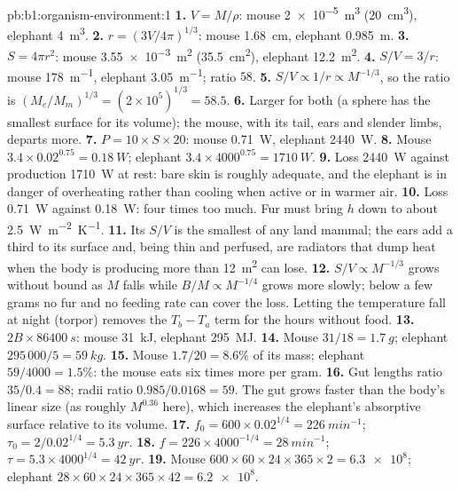 \begin{solution}{pb:b1:organism-environment:1}
\textbf{1.} $V = M/\rho$: mouse \qty{2e-5}{m^3} (\qty{20}{cm^3}),
elephant \qty{4}{m^3}.
\textbf{2.} $r = (3V/4\pi)^{1/3}$: mouse \qty{1.68}{cm}, elephant
\qty{0.985}{m}.
\textbf{3.} $S = 4\pi r^2$: mouse \qty{3.55e-3}{m^2} (\qty{35.5}{cm^2}),
elephant \qty{12.2}{m^2}.
\textbf{4.} $S/V = 3/r$: mouse \qty{178}{m^{-1}}, elephant
\qty{3.05}{m^{-1}}; ratio $58$.
\textbf{5.} $S/V \propto 1/r \propto M^{-1/3}$, so the ratio is
$(M_e/M_m)^{1/3} = (2\times 10^5)^{1/3} = 58.5$.
\textbf{6.} Larger for both (a sphere has the smallest surface for its
volume); the mouse, with its tail, ears and slender limbs, departs
more.
\textbf{7.} $P = 10\times S\times 20$: mouse \qty{0.71}{W}, elephant
\qty{2440}{W}.
\textbf{8.} Mouse $3.4\times 0.02^{0.75} = \qty{0.18}{W}$; elephant
$3.4\times 4000^{0.75} = \qty{1710}{W}$.
\textbf{9.} Loss \qty{2440}{W} against production \qty{1710}{W} at
rest: bare skin is roughly adequate, and the elephant is in danger of
overheating rather than cooling when active or in warmer air.
\textbf{10.} Loss \qty{0.71}{W} against \qty{0.18}{W}: four times too
much. Fur must bring $h$ down to about \qty{2.5}{W.m^{-2}.K^{-1}}.
\textbf{11.} Its $S/V$ is the smallest of any land mammal; the ears
add a third to its surface and, being thin and perfused, are radiators
that dump heat when the body is producing more than \qty{12}{m^2} can
lose.
\textbf{12.} $S/V \propto M^{-1/3}$ grows without bound as $M$ falls
while $B/M \propto M^{-1/4}$ grows more slowly; below a few grams no fur
and no feeding rate can cover the loss. Letting the temperature fall at
night (torpor) removes the $T_b - T_a$ term for the hours without food.
\textbf{13.} $2B\times\qty{86400}{s}$: mouse \qty{31}{kJ}, elephant
\qty{295}{MJ}.
\textbf{14.} Mouse $31/18 = \qty{1.7}{g}$; elephant
$295\,000/5 = \qty{59}{kg}$.
\textbf{15.} Mouse $1.7/20 = 8.6\%$ of its mass; elephant $59/4000 =
1.5\%$: the mouse eats six times more per gram.
\textbf{16.} Gut lengths ratio $35/0.4 = 88$; radii ratio $0.985/0.0168
= 59$. The gut grows faster than the body's linear size (as roughly
$M^{0.36}$ here), which increases the elephant's absorptive surface
relative to its volume.
\textbf{17.} $f_0 = 600\times 0.02^{1/4} = \qty{226}{min^{-1}}$;
$\tau_0 = 2/0.02^{1/4} = \qty{5.3}{yr}$.
\textbf{18.} $f = 226\times 4000^{-1/4} = \qty{28}{min^{-1}}$; $\tau =
5.3\times 4000^{1/4} = \qty{42}{yr}$.
\textbf{19.} Mouse $600\times 60\times 24\times 365\times 2 =
\num{6.3e8}$; elephant $28\times 60\times 24\times 365\times 42 =
\num{6.2e8}$.

\end{solution}
